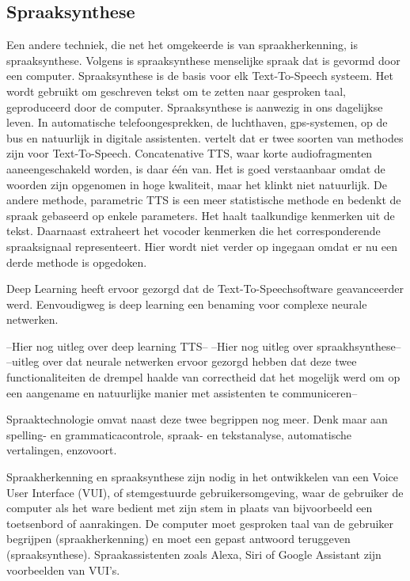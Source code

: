 \subsection{Spraaksynthese}
Een andere techniek, die net het omgekeerde is van spraakherkenning, is spraaksynthese. Volgens \autocite{Rouse2016} is spraaksynthese menselijke spraak dat is gevormd door een computer. Spraaksynthese is de basis voor elk Text-To-Speech systeem. Het wordt gebruikt om geschreven tekst om te zetten naar gesproken taal, geproduceerd door de computer.
Spraaksynthese is aanwezig in ons dagelijkse leven. In automatische telefoongesprekken, de luchthaven, gps-systemen, op de bus en natuurlijk in digitale assistenten. \autocite{Seijas2018} vertelt dat er twee soorten van methodes zijn voor Text-To-Speech. Concatenative TTS, waar korte audiofragmenten aaneengeschakeld worden, is daar één van. Het is goed verstaanbaar omdat de woorden zijn opgenomen in hoge kwaliteit, maar het klinkt niet natuurlijk. De andere methode, parametric TTS is een meer statistische methode en  bedenkt de spraak gebaseerd op enkele parameters. Het haalt taalkundige kenmerken uit de tekst. Daarnaast extraheert het vocoder kenmerken die het corresponderende spraaksignaal representeert. Hier wordt niet verder op ingegaan omdat er nu een derde methode is opgedoken.

Deep Learning heeft ervoor gezorgd dat de Text-To-Speechsoftware geavanceerder werd. Eenvoudigweg is deep learning een benaming voor complexe neurale netwerken. 

--Hier nog uitleg over deep learning TTS--
--Hier nog uitleg over spraakhsynthese--
--uitleg over dat neurale netwerken ervoor gezorgd hebben dat deze twee functionaliteiten de drempel haalde van correctheid dat het mogelijk werd om op een aangename en natuurlijke manier met assistenten te communiceren--

Spraaktechnologie omvat naast deze twee begrippen nog meer. Denk maar aan spelling- en grammaticacontrole, spraak- en tekstanalyse, automatische vertalingen, enzovoort.

Spraakherkenning en spraaksynthese zijn nodig in het ontwikkelen van een Voice User Interface (VUI), of stemgestuurde gebruikersomgeving, waar de gebruiker de computer als het ware bedient met zijn stem in plaats van bijvoorbeeld een toetsenbord of aanrakingen. De computer moet gesproken taal van de gebruiker begrijpen (spraakherkenning) en moet een gepast antwoord teruggeven (spraaksynthese). Spraakassistenten zoals Alexa, Siri of Google Assistant zijn voorbeelden van VUI's.

